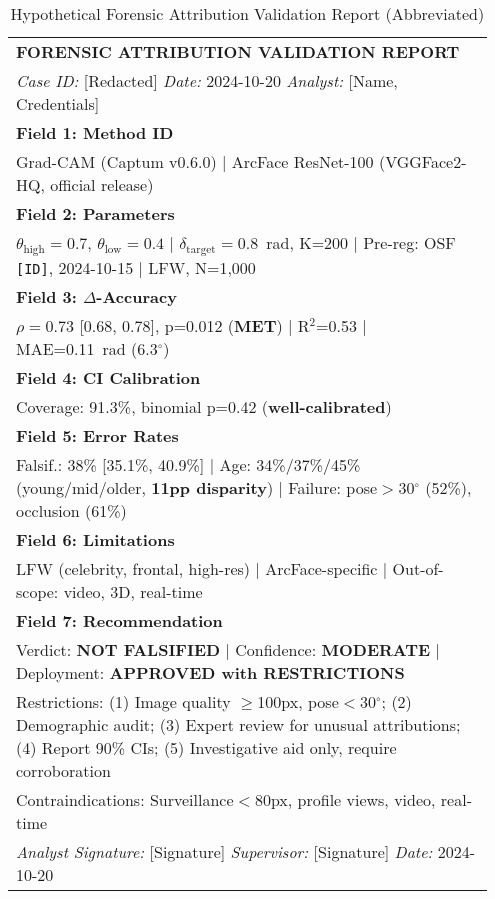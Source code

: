 \begin{table}[H]
\centering
\scriptsize
\caption{Hypothetical Forensic Attribution Validation Report (Abbreviated)}
\begin{tabular}{@{}p{0.95\linewidth}@{}}
\toprule
\textbf{FORENSIC ATTRIBUTION VALIDATION REPORT} \\
\textit{Case ID:} [Redacted] \quad \textit{Date:} 2024-10-20 \quad \textit{Analyst:} [Name, Credentials] \\ \midrule
\textbf{Field 1: Method ID} \\
Grad-CAM (Captum v0.6.0) | ArcFace ResNet-100 (VGGFace2-HQ, official release) \\ \midrule
\textbf{Field 2: Parameters} \\
$\theta_{\text{high}}=0.7$, $\theta_{\text{low}}=0.4$ | $\delta_{\text{target}}=0.8$~rad, K=200 | Pre-reg: OSF \texttt{[ID]}, 2024-10-15 | LFW, N=1,000 \\ \midrule
\textbf{Field 3: $\Delta$-Accuracy} \\
$\rho=0.73$ [0.68, 0.78], p=0.012 (\textbf{MET}) | R$^2$=0.53 | MAE=0.11~rad (6.3$^\circ$) \\ \midrule
\textbf{Field 4: CI Calibration} \\
Coverage: 91.3\%, binomial p=0.42 (\textbf{well-calibrated}) \\ \midrule
\textbf{Field 5: Error Rates} \\
Falsif.: 38\% [35.1\%, 40.9\%] | Age: 34\%/37\%/45\% (young/mid/older, \textbf{11pp disparity}) | Failure: pose$>$30$^\circ$ (52\%), occlusion (61\%) \\ \midrule
\textbf{Field 6: Limitations} \\
LFW (celebrity, frontal, high-res) | ArcFace-specific | Out-of-scope: video, 3D, real-time \\ \midrule
\textbf{Field 7: Recommendation} \\
Verdict: \textbf{NOT FALSIFIED} | Confidence: \textbf{MODERATE} | Deployment: \textbf{APPROVED with RESTRICTIONS} \\
Restrictions: (1) Image quality $\geq$100px, pose$<$30$^\circ$; (2) Demographic audit; (3) Expert review for unusual attributions; (4) Report 90\% CIs; (5) Investigative aid only, require corroboration \\
Contraindications: Surveillance$<$80px, profile views, video, real-time \\ \midrule
\textit{Analyst Signature:} [Signature] \quad \textit{Supervisor:} [Signature] \quad \textit{Date:} 2024-10-20 \\ \bottomrule
\end{tabular}
\end{table}

